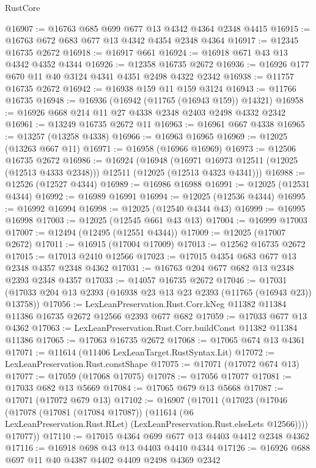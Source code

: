 \begin{lexlean}{RustCore}
\begin{coremodule}
@16907 := @16763 @685 @699 @677 @13 @4342 @4364 @2348 @4415
@16915 := @16763 @672 @683 @677 @13 @4342 @4354 @2348 @4364
@16917 := @12345 @16735 @2672
@16918 := @16917 @661
@16924 := @16918 @671 @43 @13 @4342 @4352 @4344
@16926 := @12358 @16735 @2672
@16936 := @16926 @177 @670 @11 @40 @3124 @4341 @4351 @2498 @4322 @2342
@16938 := @11757 @16735 @2672
@16942 := @16938 @159 @11 @159 @3124
@16943 := @11766 @16735
@16948 := @16936 (@16942 (@11765 (@16943 @159)) @14321)
@16958 := @16926 @668 @214 @11 @27 @4338 @2348 @2403 @2498 @4332 @2342
@16961 := @13249 @16735 @2672 @11
@16963 := @16961 @667 @4338
@16965 := @13257 (@13258 @4338)
@16966 := @16963 @16965
@16969 := @12025 (@13263 @667 @11)
@16971 := @16958 (@16966 @16969)
@16973 := @12506 @16735 @2672
@16986 := @16924
    (@16948
      (@16971 @16973 @12511 (@12025 (@12513 @4333 @2348)))
      @12511
      (@12025 (@12513 @4323 @4341)))
@16988 := @12526 (@12527 @4344)
@16989 := @16986 @16988
@16991 := @12025 (@12531 @4344)
@16992 := @16989 @16991
@16994 := @12025 (@12536 @4344)
@16995 := @16992 @16994
@16998 := @12025 (@12540 @4344 @43)
@16999 := @16995 @16998
@17003 := @12025 (@12545 @661 @43 @13)
@17004 := @16999 @17003
@17007 := @12494 (@12495 (@12551 @4344))
@17009 := @12025 (@17007 @2672)
@17011 := @16915 (@17004 @17009)
@17013 := @12562 @16735 @2672
@17015 := @17013 @2410 @12566
@17023 := @17015 @4354 @683 @677 @13 @2348 @4357 @2348 @4362
@17031 := @16763 @204 @677 @682 @13 @2348 @2393 @2348 @4357
@17033 := @14057 @16735 @2672
@17046 := @17031 (@17033 @204 @13 @2393 (@16938 @23 @13 @23 @2393 (@11765 (@16943 @23)) @13758))
@17056 := LexLeanPreservation.Rust.Corr.kNeg
    @11382
    @11384
    @11386
    @16735
    @2672
    @12566
    @2393
    @677
    @682
@17059 := @17033 @677 @13 @4362
@17063 := LexLeanPreservation.Rust.Corr.buildConst @11382 @11384 @11386
@17065 := @17063 @16735 @2672
@17068 := @17065 @674 @13 @4361
@17071 := @11614 (@11406 LexLeanTarget.RustSyntax.Lit)
@17072 := LexLeanPreservation.Rust.constShape
@17075 := @17071 (@17072 @674 @13)
@17077 := @17059 (@17068 @17075)
@17078 := @17056 @17077
@17081 := @17033 @682 @13 @5669
@17084 := @17065 @679 @13 @5668
@17087 := @17071 (@17072 @679 @13)
@17102 := @16907
    (@17011
      (@17023
        (@17046
          (@17078
            (@17081 (@17084 @17087))
            (@11614 (@6 LexLeanPreservation.Rust.RLet) (LexLeanPreservation.Rust.elseLets @12566))))
        @17077))
@17110 := @17015 @4364 @699 @677 @13 @4403 @4412 @2348 @4362
@17116 := @16918 @698 @43 @13 @4403 @4410 @4344
@17126 := @16926 @688 @697 @11 @40 @4387 @4402 @4409 @2498 @4369 @2342

\end{coremodule}
\end{lexlean}
